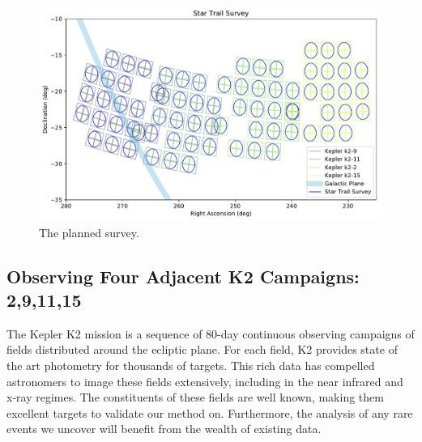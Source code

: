 \documentclass[11pt]{article}
\begin{document}
\begin{figure}[htb]
\center
\includegraphics[scale=0.7]{survey.pdf}
\caption{The planned survey.}
\label{fig:3}
\end{figure}


\clearpage

%

%

\expdesign
\subsection*{Observing Four Adjacent K2 Campaigns: 2,9,11,15}

The Kepler K2 mission is a sequence of 80-day continuous observing campaigns of fields distributed around the ecliptic plane. For each field, K2 provides state of the art photometry for thousands of targets. This rich data has compelled astronomers to image these fields extensively, including in the near infrared and x-ray regimes. The constituents of these fields are well known, making them excellent targets to validate our method on. Furthermore, the analysis of any rare events we uncover will benefit from the wealth of existing data.
\end{document}
